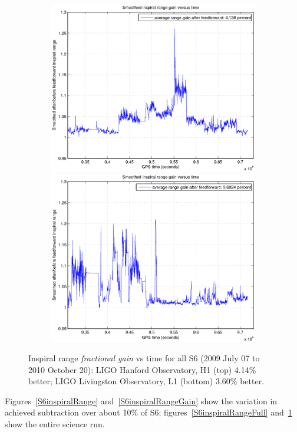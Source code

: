 \begin{figure}
\begin{center}
\includegraphics[height=75mm, width=150mm]{plots/fullAMPS/clip-gain-LHO-new.eps}
\includegraphics[height=75mm, width=150mm]{plots/fullAMPS/clip-gain-LLO-new.eps}
\caption{Inspiral range \textit{fractional gain} vs time for all S6 (2009 July 07 to 2010 October 20):
LIGO Hanford Observatory, H1 (top) 4.14\% better; LIGO Livingston Observatory, L1 (bottom) 3.60\% better.}
\label{S6inspiralRangeGainFull}
\end{center}
\end{figure}

Figures~\ref{S6inspiralRange} and~\ref{S6inspiralRangeGain} show the variation in achieved subtraction over about 10\% of S6; figures~\ref{S6inspiralRangeFull} and~\ref{S6inspiralRangeGainFull} show the entire science run.

